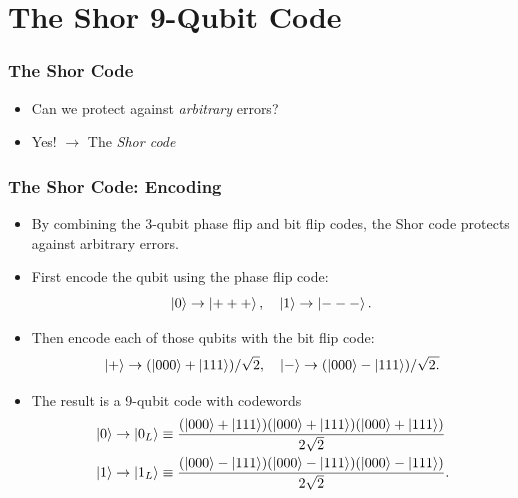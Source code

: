 \documentclass{beamer}
\begin{document}
\section{The Shor 9-Qubit Code}
\begin{frame}
    \frametitle{The Shor Code}
    \begin{itemize}
        \item<1-> Can we protect against \textit{arbitrary} errors?
        \item<2-> Yes! $\longrightarrow$ The \textit{Shor code}
    \end{itemize}
\end{frame}

\begin{frame}
    \frametitle{The Shor Code: Encoding}
    \begin{itemize}
        \item By combining the 3-qubit phase flip and bit flip codes, the Shor code protects against arbitrary errors.
        \item First encode the qubit using the phase flip code: $$\left\vert{0}\right\rangle\rightarrow\left\vert{+++}\right\rangle,\quad \left\vert{1}\right\rangle\rightarrow\left\vert{---}\right\rangle.$$
        \item Then encode each of those qubits with the bit flip code: $$\left\vert{+}\right\rangle\rightarrow (\left\vert{000}\right\rangle+\left\vert{111}\right\rangle)/\sqrt{2},\quad \left\vert{-}\right\rangle\rightarrow (\left\vert{000}\right\rangle-\left\vert{111}\right\rangle)/\sqrt{2.}$$
        \item The result is a 9-qubit code with codewords 
        \begin{align*}
            & \left\vert{0}\right\rangle \rightarrow \left\vert{0_L}\right\rangle \equiv \frac{(\left\vert{000}\right\rangle + \left\vert{111}\right\rangle)(\left\vert{000}\right\rangle + \left\vert{111}\right\rangle)(\left\vert{000}\right\rangle + \left\vert{111}\right\rangle)}{2\sqrt{2}}\\
            & \left\vert{1}\right\rangle\rightarrow \left\vert{1_L}\right\rangle \equiv \frac{(\left\vert{000}\right\rangle - \left\vert{111}\right\rangle)(\left\vert{000}\right\rangle - \left\vert{111}\right\rangle)(\left\vert{000}\right\rangle - \left\vert{111}\right\rangle)}{2\sqrt{2}}.
        \end{align*}
    \end{itemize}
\end{frame}

    
\end{document}

